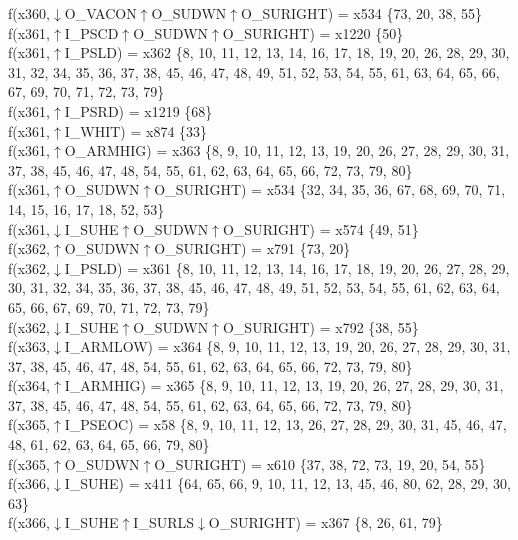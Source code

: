f(x360,$\downarrow$O\_VACON$\uparrow$O\_SUDWN$\uparrow$O\_SURIGHT) = x534 \{73, 20, 38, 55\} \\  
f(x361,$\uparrow$I\_PSCD$\uparrow$O\_SUDWN$\uparrow$O\_SURIGHT) = x1220 \{50\} \\  
f(x361,$\uparrow$I\_PSLD) = x362 \{8, 10, 11, 12, 13, 14, 16, 17, 18, 19, 20, 26, 28, 29, 30, 31, 32, 34, 35, 36, 37, 38, 45, 46, 47, 48, 49, 51, 52, 53, 54, 55, 61, 63, 64, 65, 66, 67, 69, 70, 71, 72, 73, 79\} \\  
f(x361,$\uparrow$I\_PSRD) = x1219 \{68\} \\  
f(x361,$\uparrow$I\_WHIT) = x874 \{33\} \\  
f(x361,$\uparrow$O\_ARMHIG) = x363 \{8, 9, 10, 11, 12, 13, 19, 20, 26, 27, 28, 29, 30, 31, 37, 38, 45, 46, 47, 48, 54, 55, 61, 62, 63, 64, 65, 66, 72, 73, 79, 80\} \\  
f(x361,$\uparrow$O\_SUDWN$\uparrow$O\_SURIGHT) = x534 \{32, 34, 35, 36, 67, 68, 69, 70, 71, 14, 15, 16, 17, 18, 52, 53\} \\  
f(x361,$\downarrow$I\_SUHE$\uparrow$O\_SUDWN$\uparrow$O\_SURIGHT) = x574 \{49, 51\} \\  
f(x362,$\uparrow$O\_SUDWN$\uparrow$O\_SURIGHT) = x791 \{73, 20\} \\  
f(x362,$\downarrow$I\_PSLD) = x361 \{8, 10, 11, 12, 13, 14, 16, 17, 18, 19, 20, 26, 27, 28, 29, 30, 31, 32, 34, 35, 36, 37, 38, 45, 46, 47, 48, 49, 51, 52, 53, 54, 55, 61, 62, 63, 64, 65, 66, 67, 69, 70, 71, 72, 73, 79\} \\  
f(x362,$\downarrow$I\_SUHE$\uparrow$O\_SUDWN$\uparrow$O\_SURIGHT) = x792 \{38, 55\} \\  
f(x363,$\downarrow$I\_ARMLOW) = x364 \{8, 9, 10, 11, 12, 13, 19, 20, 26, 27, 28, 29, 30, 31, 37, 38, 45, 46, 47, 48, 54, 55, 61, 62, 63, 64, 65, 66, 72, 73, 79, 80\} \\  
f(x364,$\uparrow$I\_ARMHIG) = x365 \{8, 9, 10, 11, 12, 13, 19, 20, 26, 27, 28, 29, 30, 31, 37, 38, 45, 46, 47, 48, 54, 55, 61, 62, 63, 64, 65, 66, 72, 73, 79, 80\} \\  
f(x365,$\uparrow$I\_PSEOC) = x58 \{8, 9, 10, 11, 12, 13, 26, 27, 28, 29, 30, 31, 45, 46, 47, 48, 61, 62, 63, 64, 65, 66, 79, 80\} \\  
f(x365,$\uparrow$O\_SUDWN$\uparrow$O\_SURIGHT) = x610 \{37, 38, 72, 73, 19, 20, 54, 55\} \\  
f(x366,$\downarrow$I\_SUHE) = x411 \{64, 65, 66, 9, 10, 11, 12, 13, 45, 46, 80, 62, 28, 29, 30, 63\} \\  
f(x366,$\downarrow$I\_SUHE$\uparrow$I\_SURLS$\downarrow$O\_SURIGHT) = x367 \{8, 26, 61, 79\} \\  
